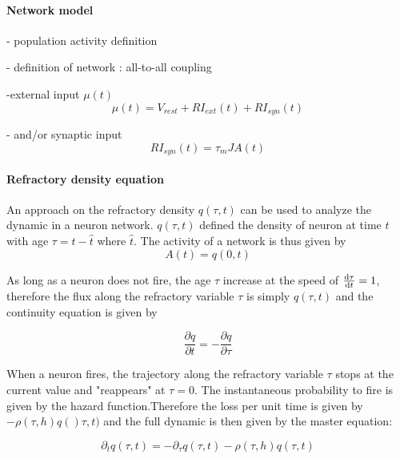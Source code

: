 \documentclass[a4paper,11pt,twoside]{article}
\def \dd  {{\rm d}}
\numberwithin{equation}{section}
\begin{document}
\paragraph{Network model}


- population activity definition

- definition of network : all-to-all coupling

-external input $\mu(t)$
\begin{equation}
\label{eq:mu}
\mu(t)=V_{rest}+RI_{ext}(t)+RI_{syn}(t)
\end{equation}

- and/or synaptic input
\begin{equation}
\label{eq:input}
RI_{syn}(t)=\tau_mJA(t)
\end{equation}

\paragraph{Refractory density equation}

An approach on the refractory density $q(\tau,t) $ can be used to analyze the dynamic in a neuron network. $q(\tau,t)$ defined the density of neuron at time $t$ with age $\tau=t-\hat{t}$ where $\hat{t}$. The activity of a network is thus given by
\begin{equation}
\label{eq:A}
A(t)=q(0,t)
\end{equation}

As long as a neuron does not fire, the age $\tau$ increase at the speed of $\frac{\dd \tau}{\dd t}=1$, therefore the flux along the refractory variable $\tau$ is simply $q(\tau,t)$ and the continuity equation  is given by

\begin{equation}
\label{eq:continuity1}
\frac{\partial q}{\partial t}=-\frac{\partial q}{\partial \tau}
\end{equation}

When a neuron fires, the trajectory along the refractory variable $\tau$ stops at the current value and "reappears" at $\tau=0$. The instantaneous probability to fire is given by the hazard function.Therefore the loss per unit time is given by $-\rho(\tau,h)q()\tau,t)$ and the full dynamic is then given by the master equation:

\begin{equation}
\label{eq:masterequation}
\partial_t q(\tau,t)=-\partial_\tau q(\tau,t)-\rho(\tau,h)q(\tau,t)
\end{equation}
\end{document}
